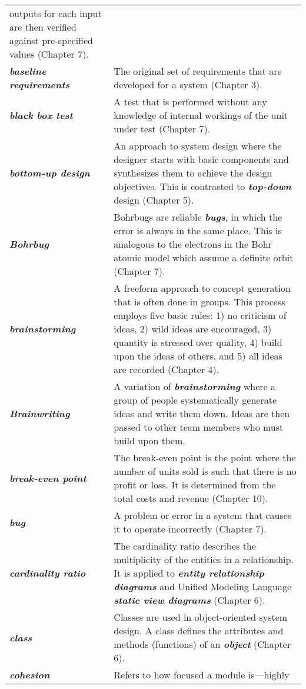 \begin{longtable}[]{@{}
  >{\raggedright\arraybackslash}p{}
  >{\raggedright\arraybackslash}p{}@{}}
outputs for each input are then verified against pre-specified values
(Chapter 7). \\
\emph{\textbf{baseline requirements}} & The original set of requirements
that are developed for a system (Chapter 3). \\
\emph{\textbf{black box test}} & A test that is performed without any
knowledge of internal workings of the unit under test (Chapter 7). \\
\emph{\textbf{bottom-up design}} & An approach to system design where
the designer starts with basic components and synthesizes them to
achieve the design objectives. This is contrasted to
\emph{\textbf{top-down}} design (Chapter 5). \\
\emph{\textbf{Bohrbug}} & Bohrbugs are reliable \emph{\textbf{bugs}}, in
which the error is always in the same place. This is analogous to the
electrons in the Bohr atomic model which assume a definite orbit
(Chapter 7). \\
\emph{\textbf{brainstorming}} & A freeform approach to concept
generation that is often done in groups. This process employs five basic
rules: 1) no criticism of ideas, 2) wild ideas are encouraged, 3)
quantity is stressed over quality, 4) build upon the ideas of others,
and 5) all ideas are recorded (Chapter 4). \\
\emph{\textbf{Brainwriting}} & A variation of
\emph{\textbf{brainstorming}} where a group of people systematically
generate ideas and write them down. Ideas are then passed to other team
members who must build upon them. \\
\emph{\textbf{break-even point}} & The break-even point is the point
where the number of units sold is such that there is no profit or loss.
It is determined from the total costs and revenue (Chapter 10). \\
\emph{\textbf{bug}} & A problem or error in a system that causes it to
operate incorrectly (Chapter 7). \\
\emph{\textbf{cardinality ratio}} & The cardinality ratio describes the
multiplicity of the entities in a relationship. It is applied to
\emph{\textbf{entity relationship diagrams}} and Unified Modeling
Language \emph{\textbf{static view diagrams}} (Chapter 6). \\
\emph{\textbf{class}} & Classes are used in object-oriented system
design. A class defines the attributes and methods (functions) of an
\emph{\textbf{object}} (Chapter 6). \\
\emph{\textbf{cohesion}} & Refers to how focused a module is---highly

\end{longtable}
